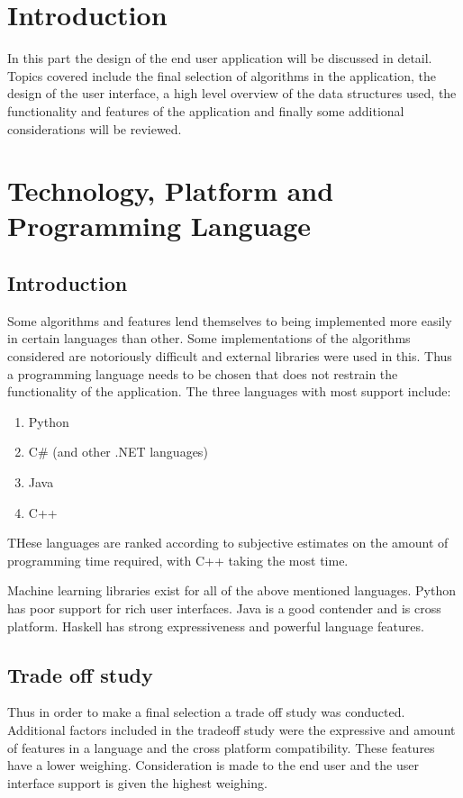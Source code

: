 

\chapter{Introduction}
In this part the design of the end user application will be discussed in detail. Topics covered include the final selection of algorithms in the application, the design of the user interface, a high level overview of the data structures used, the functionality and features of the application and finally some additional considerations will be reviewed.

\chapter{Technology, Platform and Programming Language}
\section{Introduction}
Some algorithms and features lend themselves to being implemented more easily in certain languages than other. Some implementations of the algorithms considered are notoriously difficult and external libraries were used in this. Thus a programming language needs to be chosen that does not restrain the functionality of the application. 
The three languages with most support include:
\begin{enumerate}
\item Python
\item C\# (and other .NET languages)
\item Java
\item C++
\end{enumerate}
THese languages are ranked according to subjective estimates on the amount of programming time required, with C++ taking the most time.

Machine learning libraries exist for all of the above mentioned languages. Python has poor support for rich user interfaces. Java is a good contender and is cross platform. Haskell has strong expressiveness and powerful language features.


\section{Trade off study}

Thus in order to make a final selection a trade off study was conducted. Additional factors included in the tradeoff study were the expressive and amount of features in a language and the cross platform compatibility. These features have a lower weighing.
Consideration is made to the end user and the user interface support is given the highest weighing.  

